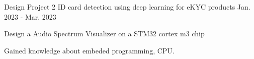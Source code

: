 \begin{cventries}
    \cventry
    {Design Project 2}
    {ID card detection using deep learning for eKYC products}
    {}
    {Jan. 2023 - Mar. 2023}
    {
        \begin{cvitems}
            \item {Design a Audio Spectrum Visualizer on a STM32 cortex m3 chip}
            \item {Gained knowledge about embeded programming, CPU.}
        \end{cvitems}
    }    

\end{cventries}